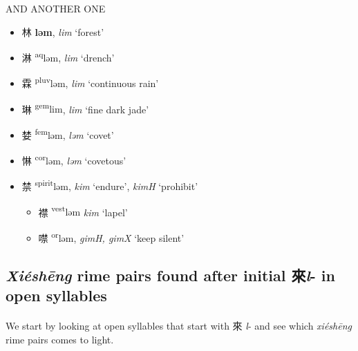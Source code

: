 AND ANOTHER ONE 

\begin{itemize}
    \item {\Large{林}} %
    {\large{\textbf{ləm}}},
    \textit{lim} `forest' %

    \item {\Large{淋}} %
    {\large{\textsuperscript{aq}ləm}},
    \textit{lim} `drench' %

    \item {\Large{霖}} %
    {\large{\textsuperscript{pluv}ləm}},
    \textit{lim} `continuous rain' %

    \item {\Large{琳}} %
    {\large{\textsuperscript{gem}lim}},
    \textit{lim} `fine dark jade' %

    \item {\Large{婪}} %
    {\large{\textsuperscript{fem}ləm}},
    \textit{ləm} `covet' %

    \item {\Large{惏}} %
    {\large{\textsuperscript{cor}ləm}},
    \textit{ləm} `covetous' %

    \item {\Large{禁}} %
    {\large{\textsuperscript{spirit}ləm}},
    \textit{kim} `endure', \textit{kimH} `prohibit' %

\begin{itemize}
    \item {\Large{襟}} %
    {\large{\textsuperscript{vest}ləm}}
    \textit{kim} `lapel' %

    \item {\Large{噤}} %
    {\large{\textsuperscript{or}ləm}},
    \textit{gimH, gimX} `keep silent' %
\end{itemize}
\end{itemize}



\subsection{\textit{Xiéshēng} rime pairs found after initial 來\textit{l}- in open syllables}

\paragraph{}
We start by looking at open syllables that start with 來 \textit{l}- and see which \textit{xiéshēng} rime pairs comes to light. 


